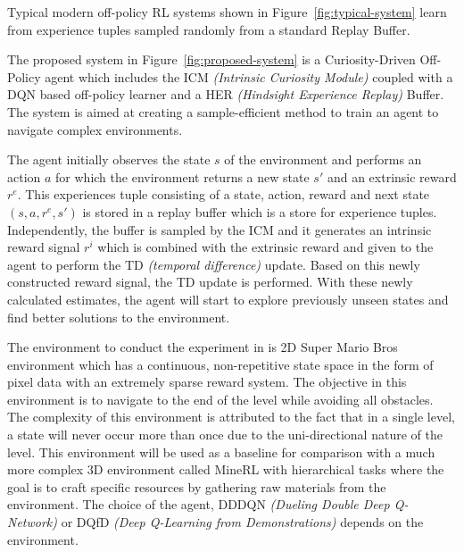 \documentclass[12pt,a4paper]{article}
\begin{document}
Typical modern  off-policy RL systems shown in Figure~\ref{fig:typical-system} learn from 
experience tuples sampled randomly from a standard Replay Buffer.

The proposed system in Figure~\ref{fig:proposed-system} is a Curiosity-Driven Off-Policy agent which includes 
the ICM \textit{(Intrinsic Curiosity Module)} coupled with a 
DQN based off-policy learner and a HER \textit{(Hindsight Experience Replay)} Buffer. 
The system is aimed at creating a sample-efficient method to train an agent to
navigate complex environments.

The agent initially observes the state $s$ of the environment and performs an action $a$ 
for which the environment returns a new state $s'$ and an extrinsic reward $r^e$. This experiences
tuple consisting of a state, action, reward and next state  $(s, a, r^e, s')$ is stored in a 
replay buffer which is a store for experience tuples. Independently, the buffer is sampled 
by the ICM and it generates an intrinsic reward signal $r^i$ which is combined with the extrinsic reward and given to the agent to perform the TD \textit{(temporal difference)} update.
Based on this newly constructed reward signal, the TD update is performed. With these newly calculated
estimates, the agent will start to explore previously unseen states and find better 
solutions to the environment.

The environment to conduct the experiment in is 2D Super Mario Bros environment which has a continuous, non-repetitive state space in the form of pixel data with an 
extremely sparse reward system. The objective in this environment is to navigate to the 
end of the level while avoiding all obstacles. The complexity of this environment is attributed
to the fact that in a single level, a state will never occur more than once due to the
uni-directional nature of the level. This environment will be used as a baseline for comparison
with a much more complex 3D environment called MineRL with hierarchical tasks where the 
goal is to craft specific resources by gathering raw materials from the environment. The choice of the agent, 
DDDQN \textit{(Dueling Double Deep Q-Network)} \cite{duel}\cite{double} or DQfD \textit{(Deep Q-Learning from Demonstrations)} 
depends on the environment.
\end{document}
